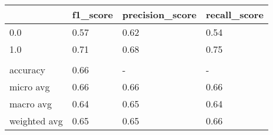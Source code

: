 \begin{tabular}{llll}
\toprule
{} & f1\_score & precision\_score & recall\_score \\
\midrule
0.0          &     0.57 &            0.62 &         0.54 \\
1.0          &     0.71 &            0.68 &         0.75 \\
             &          &                 &              \\
accuracy     &     0.66 &               - &            - \\
micro avg    &     0.66 &            0.66 &         0.66 \\
macro avg    &     0.64 &            0.65 &         0.64 \\
weighted avg &     0.65 &            0.65 &         0.66 \\
\bottomrule
\end{tabular}
